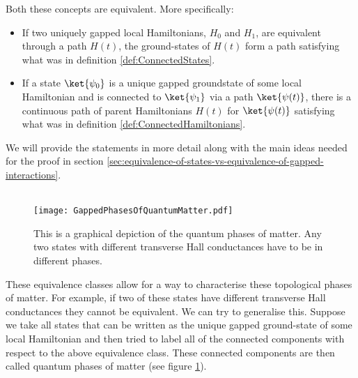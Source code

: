 Both these concepts are equivalent. More specifically:
\begin{itemize}
	\item If two uniquely gapped local Hamiltonians, $H_0$ and $H_1$, are equivalent through a path $H(t)$, the ground-states of $H(t)$ form a path satisfying what was in definition \ref{def:ConnectedStates}.
	\item If a state $\ket{\psi_0}$ is a unique gapped groundstate of some local Hamiltonian and is connected to $\ket{\psi_1}$ via a path $\ket{\psi(t)}$, there is a continuous path of parent Hamiltonians $H(t)$ for $\ket{\psi(t)}$ satisfying what was in definition \ref{def:ConnectedHamiltonians}.
\end{itemize}
We will provide the statements in more detail along with the main ideas needed for the proof in section \ref{sec:equivalence-of-states-vs-equivalence-of-gapped-interactions}.\\\\
\begin{figure}
	\centering
	\texttt{[image: GappedPhasesOfQuantumMatter.pdf]}
	\caption{This is a graphical depiction of the quantum phases of matter. Any two states with different transverse Hall conductances have to be in different phases.}
	\label{fig:GappedPhasesOfQuantumMatter}
\end{figure}
These equivalence classes allow for a way to characterise these topological phases of matter. For example, if two of these states have different transverse Hall conductances they cannot be equivalent. We can try to generalise this. Suppose we take all states that can be written as the unique gapped ground-state of some local Hamiltonian and then tried to label all of the connected components with respect to the above equivalence class. These connected components are then called quantum phases of matter (see figure \ref{fig:GappedPhasesOfQuantumMatter}).

